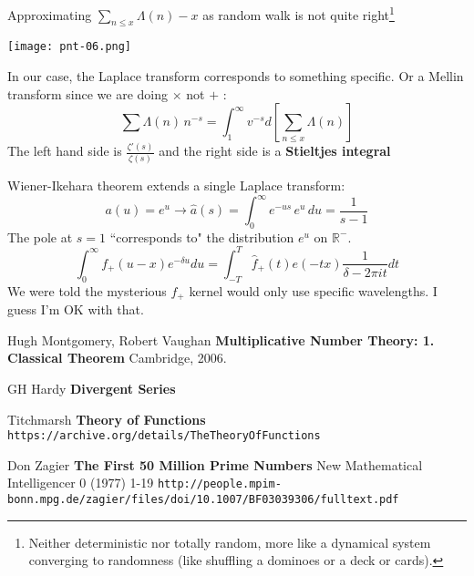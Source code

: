\documentclass[12pt]{article}
\begin{document}
\newpage

\noindent Approximating $\sum_{n \leq x} \Lambda(n) - x$ as random walk is not quite right\footnote{Neither deterministic nor totally random, more like a dynamical system converging to randomness (like shuffling a dominoes or a deck or cards).}

\texttt{[image: pnt-06.png]}


\newpage

\noindent In our case, the Laplace transform corresponds to something specific.  Or a Mellin transform since we are doing $\times$ not $+$ :
$$  \sum \Lambda(n) \, n^{-s}= \int_1^\infty v^{-s} d \left[ \sum_{n \leq x} \Lambda(n) \right]$$
The left hand side is $\frac{\zeta'(s)}{\zeta(s)} $ and the right side is a \textbf{Stieltjes integral} \newline

\noindent Wiener-Ikehara theorem extends a single Laplace transform:
$$ a(u)=e^u \to \hat{a}(s)=\int_0^\infty e^{-us}\, e^u \, du = \frac{1}{s-1} $$
The pole at $s=1$ ``corresponds to" the distribution $e^u$ on $\mathbb{R}^-$.
$$ \int_0^\infty f_+(u-x)e^{-\delta u} du
= \int_{-T}^T \hat{f}_+(t) e(-tx) \frac{1}{\delta - 2\pi i t} dt$$
We were told the mysterious $f_+$ kernel would only use specific wavelengths.  I guess I'm OK with that.

\newpage

\noindent 

\newpage

\selectfont \fontsize{12}{10}\selectfont

\begin{thebibliography}{}

\item Hugh Montgomery, Robert Vaughan \textbf{Multiplicative Number Theory: 1.  Classical Theorem} Cambridge, 2006.

\item GH Hardy \textbf{Divergent Series}

\item Titchmarsh \textbf{Theory of Functions} \texttt{https://archive.org/details/TheTheoryOfFunctions}

\item Don Zagier \textbf{The First 50 Million Prime Numbers} New Mathematical Intelligencer 0 (1977) 1-19  \newline\texttt{http://people.mpim-bonn.mpg.de/zagier/files/doi/10.1007/BF03039306/fulltext.pdf}



\end{thebibliography}
\end{document}
